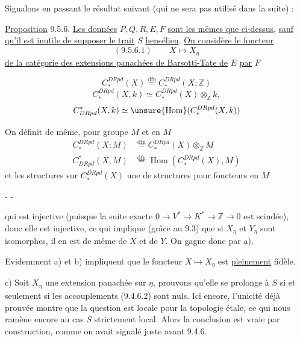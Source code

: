 Signalons en passant le résultat suivant (qui ne sera pas utilisé dans la suite) :

\uline{Proposition} 9.5.6. \uline{Les données} $P,Q,R,E,F$ \uline{sont les mêmes que ci-dessus}, \uline{sauf qu'il est inutile de supposer le trait} $S$ \uline{hensélien}. \uline{On considère le foncteur}
\[
(9.5.6.1)\qquad X\longmapsto X_\eta
\]
\uline{de la catégorie des extensions panachées de Barsotti-Tate de} $E$ \uline{par} $F$


\[
 C_*^{DRpd}(X)\overset{\mathrm{dfn}}=C_*^{DRpd}(X;\mathbb Z)
\]
\[
 C_*^{DRpd}(X,k)\simeq C_*^{DRpd}(X)\otimes_{\mathbb Z}k,
\]
\[
 C^*_{DRpd}(X,k)\simeq\unsure{\operatorname{Hom}}(C_*^{DRpd}(X,k))
\]

On définit de même, pour  groupe  $M$ et  en $M$
\[
\begin{aligned}
 C_*^{DRpd}(X;M)&\overset{\mathrm{dfn}}=C_*^{DRpd}(X)\otimes_{\mathbb Z}M\\
 C^*_{DRpd}(X,M)&\overset{\mathrm{dfn}}=\operatorname{Hom}(C_*^{DRpd}(X),M)
\end{aligned}
\]
et les structures sur $C_*^{DRpd}(X)$  une  de structures  pour  foncteurs en $M$ \unsure{\ldots}


\begin{center}-  -\end{center}

qui est injective (puisque la suite exacte $0\longrightarrow V^*\longrightarrow K^*\longrightarrow\mathbb Z\longrightarrow0$ est scindée), donc elle est injective, ce qui implique (grâce au  9.3) que si $X_\eta$ et $Y_\eta$ sont isomorphes, il en est de même de $X$ et de $Y$. On gagne donc par a).

Evidemment a) et b) impliquent que le foncteur $X\longmapsto X_\eta$ est \uline{pleinement} fidèle.

c) Soit $X_\eta$ une extension panachée sur $\eta$, prouvons qu'elle se prolonge à $S$ si et seulement si les accouplements (9.4.6.2) sont nuls. Ici encore, l'unicité déjà prouvée montre que la question est locale pour la topologie étale, ce qui nous ramène encore au cas $S$ strictement local. Alors la conclusion est vraie par construction, comme on avait signalé juste avant 9.4.6.

